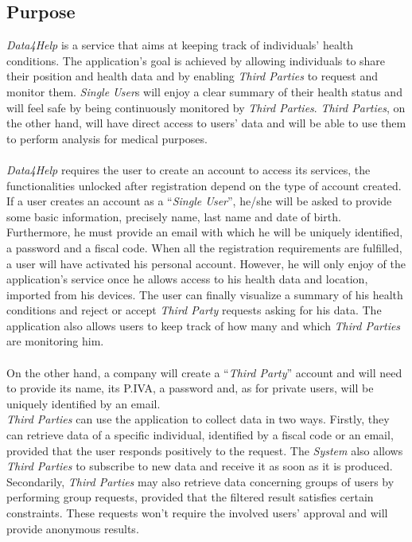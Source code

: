 \documentclass[titlepage]{article}
\begin{document}
	
	\subsection{Purpose}
{\it Data4Help} is a service that aims at keeping track of individuals’ health conditions. The application’s goal is achieved by allowing individuals to share their position and health data and by enabling {\it Third Parties} to request and monitor them. 
{\it Single User}s will enjoy a clear summary of their health status and will feel safe by being continuously monitored by {\it Third Parties}. {\it Third Parties}, on the other hand, will have direct access to users’ data and will be able to use them to perform analysis for medical purposes. \\
\\
{\it Data4Help} requires the user to create an account to access its services, the functionalities unlocked after registration depend on the type of account created.\\
If a user creates an account as a “{\it Single User}”, he/she will be asked to provide some basic information, precisely name, last name and date of birth. Furthermore, he must provide an email with which he will be uniquely identified, a password and a fiscal code. When all the registration requirements are fulfilled, a user will have activated his personal account. However, he will only enjoy of the application’s service once he allows access to his health data and location, imported from his devices.
The user can finally visualize a summary of his health conditions and reject or accept {\it Third Party} requests asking for his data. The application also allows users to keep track of how many and which {\it Third Parties} are monitoring him.\\
\\
On the other hand, a company will create a “{\it Third Party}” account and will need to provide its name, its P.IVA, a password and, as for private users, will be uniquely identified by an email.  \\
{\it Third Parties} can use the application to collect data in two ways. Firstly, they can retrieve data of a specific individual, identified by a fiscal code or an email, provided that the user responds positively to the request. The {\it System} also allows {\it Third Parties} to subscribe to new data and receive it as soon as it is produced. \\
Secondarily, {\it Third Parties} may also retrieve data concerning groups of users by performing group requests, provided that the filtered result satisfies certain constraints. These requests won’t require the involved users’ approval and will provide anonymous results.\\
\end{document}
